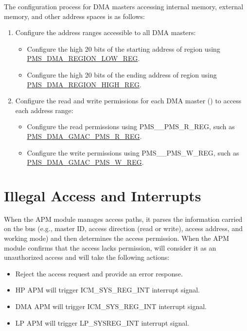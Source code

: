 \documentclass[main\_\_EN.tex]{subfiles}
\begin{document}
The configuration process for DMA masters accessing internal memory, external memory, and other address spaces is as follows:

\begin{enumerate}
    \item Configure the address ranges accessible to all DMA masters:
    \begin{itemize}
        \item Configure the high 20 bits of the starting address of region using \hyperref[regdesc:PMSDMAREGIONNLOWREG]{PMS\_DMA\_REGION\_LOW\_REG}.
        \item Configure the high 20 bits of the ending address of region using \hyperref[regdesc:PMSDMAREGIONNHIGHREG]{PMS\_DMA\_REGION\_HIGH\_REG}.
    \end{itemize}
    \item Configure the read and write permissions for each DMA master () to access each address range:
    \begin{itemize}
        \item Configure the read permissions using PMS\_\_PMS\_R\_REG, such as \hyperref[regdesc:PMSDMAGMACPMSRREG]{PMS\_DMA\_GMAC\_PMS\_R\_REG}.
        \item Configure the write permissions using PMS\_\_PMS\_W\_REG, such as \hyperref[regdesc:PMSDMAGMACPMSWREG]{PMS\_DMA\_GMAC\_PMS\_W\_REG}.
    \end{itemize}
\end{enumerate}

\section{Illegal Access and Interrupts}

When the APM module manages access paths, it parses the information carried on the bus (e.g., master ID, access direction (read or write), access address, and working mode) and then determines the access permission. When the APM module confirms that the access lacks permission, \chipname{} will consider it as an unauthorized access and will take the following actions:

\begin{itemize}
    \item Reject the access request and provide an error response.
    \item HP APM will trigger ICM\_SYS\_REG\_INT interrupt signal.
    \item DMA APM will trigger ICM\_SYS\_REG\_INT interrupt signal.
    \item LP APM will trigger LP\_SYSREG\_INT interrupt signal.
\end{itemize}
\end{document}
